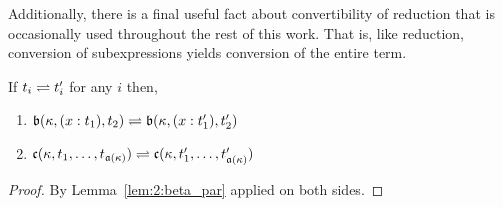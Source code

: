 Additionally, there is a final useful fact about convertibility of reduction that is occasionally used throughout the rest of this work.
That is, like reduction, conversion of subexpressions yields conversion of the entire term.

\begin{lemma}
    \label{lem:2:conv_congr}
    If $t_i \rightleftharpoons t_i^\prime$ for any $i$ then,
    \begin{enumerate}
        \item $\mathfrak{b}(\kappa, (x : t_1), t_2) \rightleftharpoons \mathfrak{b}(\kappa, (x : t_1^\prime), t_2^\prime)$
        \item $\mathfrak{c}(\kappa, t_1,\ldots,t_{\mathfrak{a}(\kappa)}) \rightleftharpoons \mathfrak{c}(\kappa, t_1^\prime,\ldots,t_{\mathfrak{a}(\kappa)}^\prime)$
    \end{enumerate}
\end{lemma}
\begin{proof}
    By Lemma~\ref{lem:2:beta_par} applied on both sides.
\end{proof}
